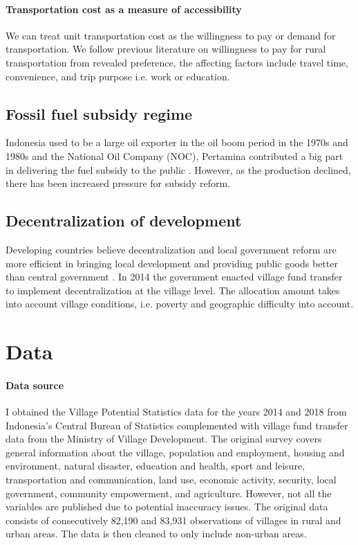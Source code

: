 \documentclass[letterpaper,12pt,leqno]{article}
\begin{document}
\paragraph{Transportation cost as a measure of accessibility} We can treat unit transportation cost as the willingness to pay or demand for transportation. We follow previous literature on willingness to pay for rural transportation from revealed preference, the affecting factors include travel time, convenience, and trip purpose i.e. work or education.



\subsection{Fossil fuel subsidy regime}

Indonesia used to be a large oil exporter in the oil boom period in the 1970s and 1980s and the National Oil Company (NOC), Pertamina contributed a big part in delivering the fuel subsidy to the public \citep{ichsan_2022}. However, as the production declined, there has been increased pressure for subsidy reform. 

\subsection{Decentralization of development}

Developing countries believe decentralization and local government reform are more efficient in bringing local development \citep{vazquez_2017} and providing public goods better than central government \citep{arends2020}. In 2014 the government enacted village fund transfer to implement decentralization at the village level. The allocation amount takes into account village conditions, i.e. poverty and geographic difficulty into account.

\section{Data}\label{s:data}

\paragraph{Data source} I obtained the Village Potential Statistics data for the years 2014 and 2018 from Indonesia's Central Bureau of Statistics complemented with village fund transfer data from the Ministry of Village Development. The original survey covers general information about the village, population and employment, housing and environment, natural disaster, education and health, sport and leisure, transportation and communication, land use, economic activity, security, local government, community empowerment, and agriculture. However, not all the variables are published due to potential inaccuracy issues. The original data consists of consecutively 82,190 and 83,931 observations of villages in rural and urban areas. The data is then cleaned to only include non-urban areas.
\end{document}
